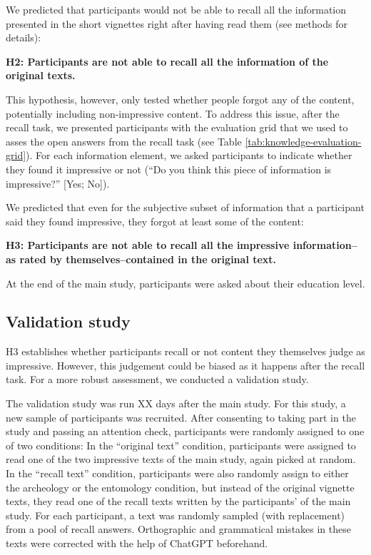 \documentclass[
  doc,floatsintext]{apa6}
\begin{document}
We predicted that participants would not be able to recall all the information presented in the short vignettes right after having read them (see methods for details):

\textbf{H2: Participants are not able to recall all the information of the original texts.}

This hypothesis, however, only tested whether people forgot any of the content, potentially including non-impressive content. To address this issue, after the recall task, we presented participants with the evaluation grid that we used to asses the open answers from the recall task (see Table \ref{tab:knowledge-evaluation-grid}). For each information element, we asked participants to indicate whether they found it impressive or not (``Do you think this piece of information is impressive?'' {[}Yes; No{]}).

We predicted that even for the subjective subset of information that a participant said they found impressive, they forgot at least some of the content:

\textbf{H3: Participants are not able to recall all the impressive information--as rated by themselves--contained in the original text.}

At the end of the main study, participants were asked about their education level.

\subsection{Validation study}\label{validation-study}

H3 establishes whether participants recall or not content they themselves judge as impressive. However, this judgement could be biased as it happens after the recall task. For a more robust assessment, we conducted a validation study.

The validation study was run XX days after the main study. For this study, a new sample of participants was recruited. After consenting to taking part in the study and passing an attention check, participants were randomly assigned to one of two conditions: In the ``original text'' condition, participants were assigned to read one of the two impressive texts of the main study, again picked at random. In the ``recall text'' condition, participants were also randomly assign to either the archeology or the entomology condition, but instead of the original vignette texts, they read one of the recall texts written by the participants' of the main study. For each participant, a text was randomly sampled (with replacement) from a pool of recall answers. Orthographic and grammatical mistakes in these texts were corrected with the help of ChatGPT beforehand.
\end{document}
